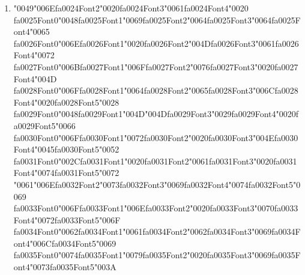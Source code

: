\documentclass[12pt]{article}
\begin{document}
\begin{enumerate}[label=Q\arabic*.]
\item {\char"0049}{\char"006E}{\csname fa0024Font2\endcsname\char"0020}{\csname fa0024Font3\endcsname\char"0061}{\csname fa0024Font4\endcsname\char"0020} {\csname fa0025Font0\endcsname\char"0048}{\csname fa0025Font1\endcsname\char"0069}{\csname fa0025Font2\endcsname\char"0064}{\csname fa0025Font3\endcsname\char"0064}{\csname fa0025Font4\endcsname\char"0065} {\csname fa0026Font0\endcsname\char"006E}{\csname fa0026Font1\endcsname\char"0020}{\csname fa0026Font2\endcsname\char"004D}{\csname fa0026Font3\endcsname\char"0061}{\csname fa0026Font4\endcsname\char"0072} {\csname fa0027Font0\endcsname\char"006B}{\csname fa0027Font1\endcsname\char"006F}{\csname fa0027Font2\endcsname\char"0076}{\csname fa0027Font3\endcsname\char"0020}{\csname fa0027Font4\endcsname\char"004D} {\csname fa0028Font0\endcsname\char"006F}{\csname fa0028Font1\endcsname\char"0064}{\csname fa0028Font2\endcsname\char"0065}{\csname fa0028Font3\endcsname\char"006C}{\csname fa0028Font4\endcsname\char"0020}{\csname fa0028Font5\endcsname\char"0028} {\csname fa0029Font0\endcsname\char"0048}{\csname fa0029Font1\endcsname\char"004D}{\char"004D}{\csname fa0029Font3\endcsname\char"0029}{\csname fa0029Font4\endcsname\char"0020}{\csname fa0029Font5\endcsname\char"0066} {\csname fa0030Font0\endcsname\char"006F}{\csname fa0030Font1\endcsname\char"0072}{\csname fa0030Font2\endcsname\char"0020}{\csname fa0030Font3\endcsname\char"004E}{\csname fa0030Font4\endcsname\char"0045}{\csname fa0030Font5\endcsname\char"0052} {\csname fa0031Font0\endcsname\char"002C}{\csname fa0031Font1\endcsname\char"0020}{\csname fa0031Font2\endcsname\char"0061}{\csname fa0031Font3\endcsname\char"0020}{\csname fa0031Font4\endcsname\char"0074}{\csname fa0031Font5\endcsname\char"0072} {\char"0061}{\char"006E}{\csname fa0032Font2\endcsname\char"0073}{\csname fa0032Font3\endcsname\char"0069}{\csname fa0032Font4\endcsname\char"0074}{\csname fa0032Font5\endcsname\char"0069} {\csname fa0033Font0\endcsname\char"006F}{\csname fa0033Font1\endcsname\char"006E}{\csname fa0033Font2\endcsname\char"0020}{\csname fa0033Font3\endcsname\char"0070}{\csname fa0033Font4\endcsname\char"0072}{\csname fa0033Font5\endcsname\char"006F} {\csname fa0034Font0\endcsname\char"0062}{\csname fa0034Font1\endcsname\char"0061}{\csname fa0034Font2\endcsname\char"0062}{\csname fa0034Font3\endcsname\char"0069}{\csname fa0034Font4\endcsname\char"006C}{\csname fa0034Font5\endcsname\char"0069} {\csname fa0035Font0\endcsname\char"0074}{\csname fa0035Font1\endcsname\char"0079}{\csname fa0035Font2\endcsname\char"0020}{\csname fa0035Font3\endcsname\char"0069}{\csname fa0035Font4\endcsname\char"0073}{\csname fa0035Font5\endcsname\char"003A}

\end{enumerate}
\end{document}
